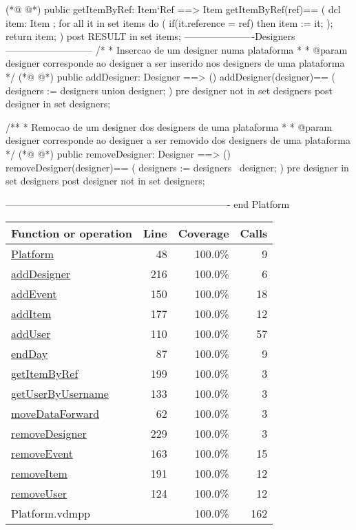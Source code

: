 \begin{vdmpp}[breaklines=true]
(*@
\label{getItemByRef:199}
@*)
 public getItemByRef: Item`Ref ==> Item
  getItemByRef(ref)== 
  (
   dcl item: Item ;
   for all it in set items do (
    if(it.reference = ref) then
     item := it;
   );
   return item;
  )
  post RESULT in set items;
----------------------Designers---------------------------
 /*
 * Insercao de um designer numa plataforma
 * 
 * @param designer corresponde ao designer a ser inserido nos designers de uma plataforma
 */
(*@
\label{addDesigner:216}
@*)
 public addDesigner: Designer ==> ()
  addDesigner(designer)==
  (
   designers := designers union {designer};
  )
  pre designer not in set designers
  post designer in set designers;
  
 /**
 * Remocao de um designer dos designers de uma plataforma
 * 
 * @param designer corresponde ao designer a ser removido dos designers de uma plataforma
 */ 
(*@
\label{removeDesigner:229}
@*)
 public removeDesigner: Designer ==> ()
  removeDesigner(designer)==
  (
   designers := designers \ {designer};
  )
  pre designer  in set designers
  post designer not in set designers;
 
----------------------------------------------------------------------
end Platform
\end{vdmpp}
\bigskip
\begin{longtable}{|l|r|r|r|}
\hline
Function or operation & Line & Coverage & Calls \\
\hline
\hline
\hyperref[Platform:48]{Platform} & 48&100.0\% & 9 \\
\hline
\hyperref[addDesigner:216]{addDesigner} & 216&100.0\% & 6 \\
\hline
\hyperref[addEvent:150]{addEvent} & 150&100.0\% & 18 \\
\hline
\hyperref[addItem:177]{addItem} & 177&100.0\% & 12 \\
\hline
\hyperref[addUser:110]{addUser} & 110&100.0\% & 57 \\
\hline
\hyperref[endDay:87]{endDay} & 87&100.0\% & 9 \\
\hline
\hyperref[getItemByRef:199]{getItemByRef} & 199&100.0\% & 3 \\
\hline
\hyperref[getUserByUsername:133]{getUserByUsername} & 133&100.0\% & 3 \\
\hline
\hyperref[moveDataForward:62]{moveDataForward} & 62&100.0\% & 3 \\
\hline
\hyperref[removeDesigner:229]{removeDesigner} & 229&100.0\% & 3 \\
\hline
\hyperref[removeEvent:163]{removeEvent} & 163&100.0\% & 15 \\
\hline
\hyperref[removeItem:191]{removeItem} & 191&100.0\% & 12 \\
\hline
\hyperref[removeUser:124]{removeUser} & 124&100.0\% & 12 \\
\hline
\hline
Platform.vdmpp & & 100.0\% & 162 \\
\hline
\end{longtable}

